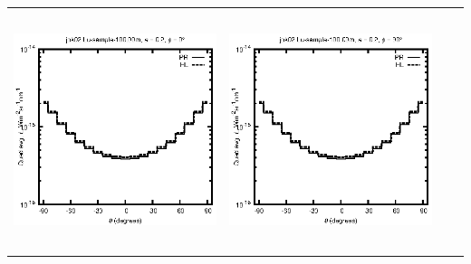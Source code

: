 \begin{tabular}{c c c c}
\includegraphics[height=7cm]{../eps/jok02_Lu_sample_100.00m_fwd.eps} &
\includegraphics[height=7cm]{../eps/jok02_Lu_sample_100.00m_cross.eps} \\
\end{tabular}

\pagebreak

